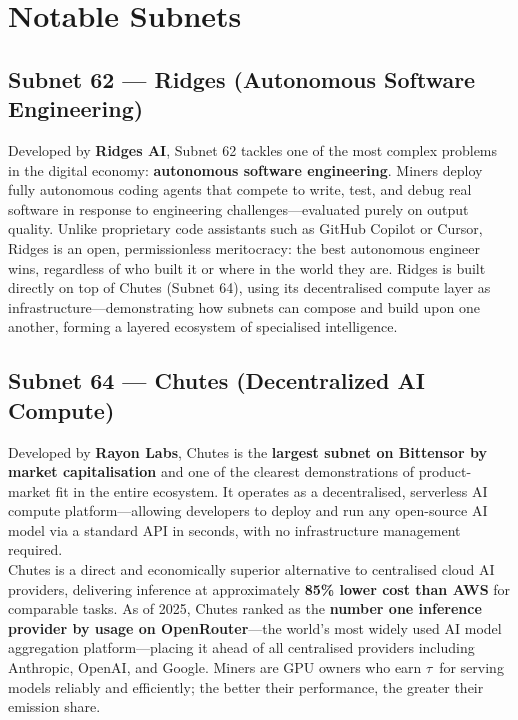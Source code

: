 \documentclass[12pt, a4paper, oneside]{report}
\newcommand{\TAO}{$\tau$}            %
\theoremstyle{definition}
\begin{document}
\section{Notable Subnets}

\subsection*{Subnet 62 — Ridges (Autonomous Software Engineering)}
Developed by \textbf{Ridges AI}, Subnet 62 tackles one of the most complex 
problems in the digital economy: \textbf{autonomous software engineering}. 
Miners deploy fully autonomous coding agents that compete to write, test, 
and debug real software in response to engineering challenges—evaluated 
purely on output quality. Unlike proprietary code assistants such as GitHub 
Copilot or Cursor, Ridges is an open, permissionless meritocracy: the best 
autonomous engineer wins, regardless of who built it or where in the world 
they are. Ridges is built directly on top of Chutes (Subnet 64), using its 
decentralised compute layer as infrastructure—demonstrating how subnets can 
compose and build upon one another, forming a layered ecosystem of 
specialised intelligence.

\subsection*{Subnet 64 — Chutes (Decentralized AI Compute)}
Developed by \textbf{Rayon Labs}, Chutes is the \textbf{largest subnet on 
Bittensor by market capitalisation} and one of the clearest demonstrations 
of product-market fit in the entire ecosystem. It operates as a decentralised, 
serverless AI compute platform—allowing developers to deploy and run any 
open-source AI model via a standard API in seconds, with no infrastructure 
management required.\\[0.4cm]

Chutes is a direct and economically superior alternative to centralised cloud 
AI providers, delivering inference at approximately \textbf{85\% lower cost 
than AWS} for comparable tasks. As of 2025, Chutes ranked as the 
\textbf{number one inference provider by usage on OpenRouter}—the world's 
most widely used AI model aggregation platform—placing it ahead of all 
centralised providers including Anthropic, OpenAI, and Google. Miners are 
GPU owners who earn \TAO\ for serving models reliably and efficiently; 
the better their performance, the greater their emission share.
\end{document}
